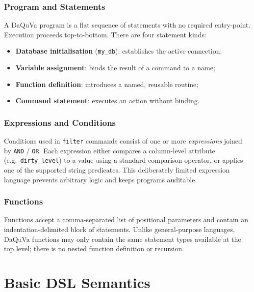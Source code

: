 \begin{itemize}[label=-, noitemsep]
\subsubsection{Program and Statements}

A DaQuVa program is a flat sequence of statements with no required entry-point.
Execution proceeds top-to-bottom. There are four statement kinds:

\begin{itemize}[label=-, noitemsep]
  \item \textbf{Database initialisation} (\texttt{my\_db}): establishes the
          active connection;
    \item \textbf{Variable assignment}: binds the result of a command to a name;
    \item \textbf{Function definition}: introduces a named, reusable routine;
    \item \textbf{Command statement}: executes an action without binding.
\end{itemize}

\subsubsection{Expressions and Conditions}

Conditions used in \texttt{filter} commands consist of one or more
\emph{expressions} joined by \texttt{AND} / \texttt{OR}. Each expression
either compares a column-level attribute (e.g.\ \texttt{dirty\_level}) to a
value using a standard comparison operator, or applies one of the supported
string predicates. This deliberately limited expression language prevents
arbitrary logic and keeps programs auditable.

\subsubsection{Functions}

Functions accept a comma-separated list of positional parameters and contain
an indentation-delimited block of statements. Unlike general-purpose languages,
DaQuVa functions may only contain the same statement types available at the
top level; there is no nested function definition or recursion.

\section{Basic DSL Semantics}
\label{sec:semantics}


\end{itemize}
